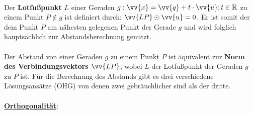         \begin{Definition}
            \paragraph{} Der \textbf{Lotfußpunkt} $L$ einer Geraden $g:\vv{x}=\vv{q}+t\cdot\vv{u};t\in\R$ zu einem Punkt $P\notin g$
            ist definiert durch: $\vv{LP}\odot\vv{u}=0$. Er ist somit der dem Punkt $P$ am nähesten gelegenen Punkt der Gerade $g$ und wird
            folglich hauptsächlich zur Abstandsberechnung genutzt.
        \end{Definition}

        \paragraph{} Der Abstand von einer Geraden $g$ zu einem Punkt $P$ ist äquivalent zur \textbf{Norm des Verbindungsvektors $\vv{LP}$}, wobei $L$
        der Lotfußpunkt der Geraden $g$ zu $P$ ist. Für die Berechnung des Abstands gibt es drei verschiedene Lösungsansätze (OHG) von denen zwei
        gebräuchlicher sind als der dritte.
        \\
        \\
        \underline{\textbf{Orthogonalität}}:
